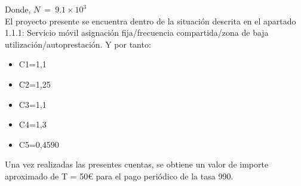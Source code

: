 Donde, $N\ =\ 9.1 \times 10^3$\\
El proyecto presente se encuentra dentro de la situación descrita en el apartado 1.1.1: Servicio móvil asignación fija/frecuencia compartida/zona de baja utilización/autoprestación. Y por tanto: 
\begin{itemize}
\item C1=1,1
\item C2=1,25
\item C3=1,1
\item C4=1,3
\item C5=0,4590
\end{itemize}


Una vez realizadas las presentes cuentas, se obtiene un valor de importe aproximado de T = 50\euro{} para el pago  periódico de la tasa 990. 
